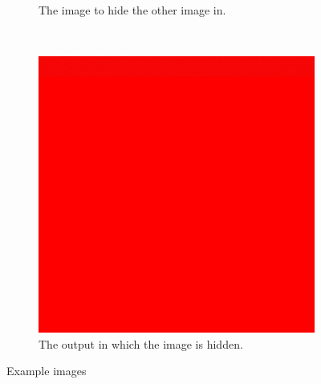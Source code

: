 \documentclass[12pt]{article}
\begin{document}
\begin{figure}[h]
\begin{subfigure}[t]{0.3\textwidth}
			\caption{The image to hide the other image in.}
		\end{subfigure}
		~
		\begin{subfigure}[t]{0.3\textwidth}
			\includegraphics[width=\textwidth]{image/newRed.png}
			\caption{The output in which the image is hidden.}
		\end{subfigure}
		\caption{Example images}
	\end{figure}
	
\end{document}
